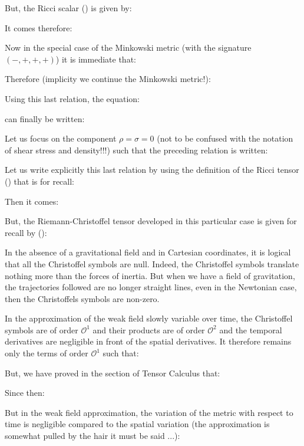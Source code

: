 	But, the Ricci scalar () is given by:
	
	It comes therefore:
	
	Now in the special case of the Minkowski metric (with the signature $(-, +, +, +)$) it is immediate that:
	
	Therefore (implicity we continue the Minkowski metric!):
	
	Using this last relation, the equation:
	
	can finally be written:
	
	Let us focus on the component $\rho=\sigma=0$ (not to be confused with the notation of shear stress and density!!!) such that the preceding relation is written:
	
	Let us write explicitly this last relation by using the definition of the Ricci tensor () that is for recall:
	
	Then it comes:
	
	But, the Riemann-Christoffel tensor developed in this particular case is given for recall by ():
	
	\begin{tcolorbox}[title=Remark,colframe=black,arc=10pt]
	In the absence of a gravitational field and in Cartesian coordinates, it is logical that all the Christoffel symbols are null. Indeed, the Christoffel symbols translate nothing more than the forces of inertia. But when we have a field of gravitation, the trajectories followed are no longer straight lines, even in the Newtonian case, then the Christoffels symbols are non-zero.
	\end{tcolorbox}
	In the approximation of the weak field slowly variable over time, the Christoffel symbols are of order $\mathcal{O}^1$ and their products are of order $\mathcal{O}^2$ and the temporal derivatives are negligible in front of the spatial derivatives. It therefore remains only the terms of order $\mathcal{O}^1$ such that:
	
	But, we have proved in the section of Tensor Calculus that:
	
	Since then:
	
	But in the weak field approximation, the variation of the metric with respect to time is negligible compared to the spatial variation (the approximation is somewhat pulled by the hair it must be said ...):
	
